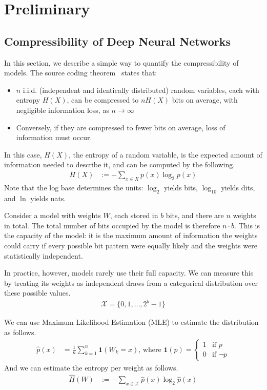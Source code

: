 \documentclass[../main.tex]{subfiles}
\begin{document}
\chapter{Preliminary}

\section{Compressibility of Deep Neural Networks}
In this section, we describe a simple way to quantify the compressibility of models. The source coding theorem~\cite{shannonInformationTheory} states that:
\begin{itemize}
    \item $n$ i.i.d. (independent and identically distributed) random variables, each with entropy $H(X)$, can be compressed to $nH(X)$ bits on average, with negligible information loss, as $n \rightarrow \infty$ 
    \item Conversely, if they are compressed to fewer bits on average, loss of information must occur.
\end{itemize}
In this case, $H(X)$, the entropy of a random variable, is the expected amount of information needed to describe it, and can be computed by the following.
\begin{align}
H(X)&:=-\sum_{x\in X}p(x)\log_2 p(x)
\end{align}
Note that the log base determines the units: $\log_2$ yields bits, $\log_{10}$ yields dits, and $\ln$ yields nats.

Consider a model with weights $W$, each stored in $b$ bits, and there are $n$ weights in total. The total number of bits occupied by the model is therefore $n\cdot b$. This is the capacity of the model: it is the maximum amount of information the weights could carry if every possible bit pattern were equally likely and the weights were statistically independent. 

In practice, however, models rarely use their full capacity. We can measure this by treating its weights as independent draws from a categorical distribution over these possible values.
\begin{align}
    \mathcal{X} = \{0, 1, \dots, 2^b-1\}
\end{align}

We can use Maximum Likelihood Estimation (MLE) to estimate the distribution as follows.
\begin{align}
    \hat{p}(x) &= \frac1n \sum^n_{k=1} \mathbf{1} (W_k=x) 
\text{, where } \mathbf{1}(p)=\begin{cases}
1 & \text{if }p\\
0 & \text{if }\neg p
\end{cases}
\end{align}
And we can estimate the entropy per weight as follows.
\begin{align}
    \hat{H}(W)&:=-\sum_{x\in \mathcal{X}}\hat{p}(x)\log_2 \hat{p}(x)
\end{align}
\end{document}
